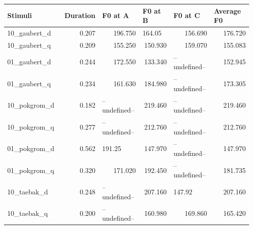 \documentclass[a4paper]{article}
\begin{document}
\begin{table}[H]
    \label{tab:tablestressedsyl}
\begin{tabular}{|l|r|l|r|l|r|} 
\hline
Stimuli         & \multicolumn{1}{l|}{Duration} & F0 at A                           & \multicolumn{1}{l|}{F0 at B}            & F0 at C                       & \multicolumn{1}{l|}{Average F0}  \\ 
\hline
10\_gaubert\_d~ & 0.207                         & \multicolumn{1}{r|}{196.750} & \multicolumn{1}{l|}{164.05}        & \multicolumn{1}{r|}{156.690} & 176.720                          \\ 
\hline
10\_gaubert\_q~ & 0.209                         & \multicolumn{1}{r|}{155.250} & 150.930                            & \multicolumn{1}{r|}{159.070} & 155.083                          \\ 
\hline
01\_gaubert\_d~ & 0.244                         & \multicolumn{1}{r|}{172.550} & 133.340                            & --undefined--                & 152.945                          \\ 
\hline
01\_gaubert\_q~ & 0.234                         & \multicolumn{1}{r|}{161.630} & 184.980                            & --undefined--                & 173.305                          \\ 
\hline
10\_pokgrom\_d~ & 0.182                         & --undefined--                & 219.460                            & --undefined--                & 219.460                          \\ 
\hline
10\_pokgrom\_q~ & 0.277                         & --undefined--                & 212.760                            & --undefined--                & 212.760                          \\ 
\hline
01\_pokgrom\_d~ & 0.562                         & 191.25                       & 147.970                            & --undefined--                & 147.970                          \\ 
\hline
01\_pokgrom\_q~ & 0.320                         & \multicolumn{1}{r|}{171.020} & 192.450                            & --undefined--                & 181.735                          \\ 
\hline
10\_taebak\_d~  & 0.248                         & --undefined--                & 207.160                            & 147.92                       & 207.160                          \\ 
\hline
10\_taebak\_q~  & 0.200                         & --undefined--                & 160.980                            & \multicolumn{1}{r|}{169.860} & 165.420                          \\ 

\end{tabular}
\end{table}
\end{document}
